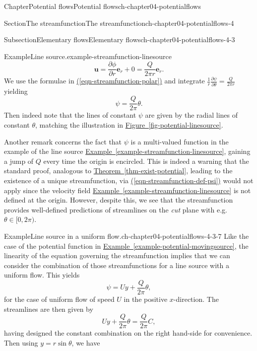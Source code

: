 \documentclass[oneside,10pt,]{book}
\newcommand{\xreffont}{\relax}
\numberwithin{equation}{section}
\newcommand{\pd}[2]{\frac{\partial#1}{\partial#2}}
\newcommand{\be}{\boldsymbol{e}}
\newcommand{\bu}{\boldsymbol{u}}
\begin{document}
\begin{chapterptx}{Chapter}{Potential flows}{}{Potential flows}{}{}{ch-chapter04-potentialflows}
\begin{sectionptx}{Section}{The streamfunction}{}{The streamfunction}{}{}{ch-chapter04-potentialflows-4}
\begin{subsectionptx}{Subsection}{Elementary flows}{}{Elementary flows}{}{}{ch-chapter04-potentialflows-4-3}
\begin{example}{Example}{Line source.}{example-streamfunction-linesource}
\begin{equation}
\bu = \pd{\phi}{r}\be_r + 0 = \frac{Q}{2\pi r} \be_r.\label{eqn-streamfunction-u-linesource}
\end{equation}
We use the formulae in \hyperref[eqn-streamfunction-polar]{({\xreffont\ref{eqn-streamfunction-polar}})} and integrate \(\frac{1}{r} \pd{\psi}{\theta} = \frac{Q}{2\pi r}\) yielding%
\begin{equation*}
\psi = \frac{Q}{2\pi} \theta.
\end{equation*}
Then indeed note that the lines of constant \(\psi\) are given by the radial lines of constant \(\theta\), matching the illustration in \hyperref[fig-potential-linesource]{Figure~{\xreffont\ref{fig-potential-linesource}}}.%
\end{example}
Another remark concerns the fact that \(\psi\) is a multi-valued function in the example of the line source \hyperref[example-streamfunction-linesource]{Example~{\xreffont\ref{example-streamfunction-linesource}}}, gaining a jump of \(Q\) every time the origin is encircled. This is indeed a warning that the standard proof, analogous to \hyperref[thm-exist-potential]{Theorem~{\xreffont\ref{thm-exist-potential}}}, leading to the existence of a unique streamfunction, via \hyperref[eqn-streamfunction-def-psi]{({\xreffont\ref{eqn-streamfunction-def-psi}})} would not apply since the velocity field \hyperref[example-streamfunction-linesource]{Example~{\xreffont\ref{example-streamfunction-linesource}}} is not defined at the origin. However, despite this, we see that the streamfunction provides well-defined predictions of streamlines on the \emph{cut} plane with e.g. \(\theta \in [0, 2\pi)\).%
\begin{example}{Example}{Line source in a uniform flow.}{ch-chapter04-potentialflows-4-3-7}%
Like the case of the potential function in \hyperref[example-potential-movingsource]{Example~{\xreffont\ref{example-potential-movingsource}}}, the linearity of the equation governing the streamfunction implies that we can consider the combination of those streamfunctions for a line source with a uniform flow. This yields%
\begin{equation*}
\psi = Uy + \frac{Q}{2\pi}\theta, 
\end{equation*}
for the case of uniform flow of speed \(U\) in the positive \(x\)-direction. The streamlines are then given by%
\begin{equation*}
Uy + \frac{Q}{2\pi} \theta = \frac{Q}{2\pi}C,
\end{equation*}
having designed the constant combination on the right hand-side for convenience. Then using \(y = r\sin\theta\), we have%

\end{example}
\end{subsectionptx}
\end{sectionptx}
\end{chapterptx}
\end{document}
